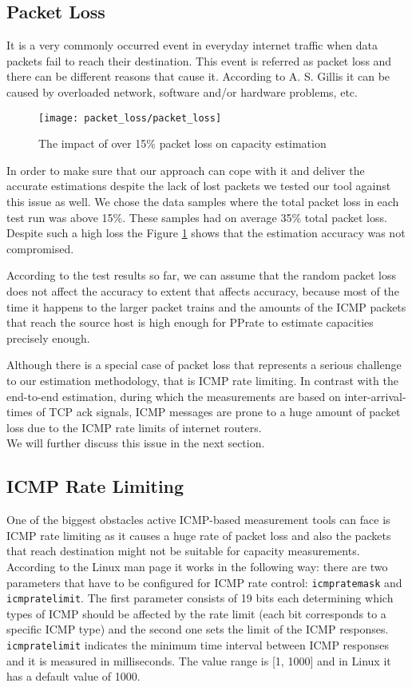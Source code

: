 \subsection{Packet Loss}
It is a very commonly occurred event in everyday internet traffic when data packets fail to reach their destination. This event is referred as packet loss and there can be different reasons that cause it. According to A. S. Gillis\cite{packet_loss_explained} it can be caused by overloaded network, software and/or hardware problems, etc.

\begin{figure}[h]
 \centering
 \texttt{[image: packet\_loss/packet\_loss]}
 \caption{The impact of over 15\% packet loss on capacity estimation}
 \label{packet_loss_graph}
\end{figure}

 In order to make sure that our approach can cope with it and deliver the accurate estimations despite the lack of lost packets we tested our tool against this issue as well.
We chose the data samples where the total packet loss in each test run was above 15\%. These samples had on average 35\% total packet loss. Despite such a high loss the Figure \ref{packet_loss_graph} shows that the estimation accuracy was not compromised. 

According to the test results so far, we can assume that the random packet loss does not affect the accuracy to extent that affects accuracy, because most of the time it happens to the larger packet trains and the amounts of the ICMP packets that reach the source host is high enough for PPrate to estimate capacities precisely enough.
 
Although there is a special case of packet loss that represents a serious challenge to our estimation methodology, that is ICMP rate limiting. In contrast with the end-to-end estimation, during which the measurements are based on inter-arrival-times of TCP ack signals, ICMP messages are prone to a huge amount of packet loss due to the ICMP rate limits of internet routers.\\ 
We will further discuss this issue in the next section.


\subsection{ICMP Rate Limiting}
One of the biggest obstacles active ICMP-based measurement tools can face is ICMP rate limiting as it causes a huge rate of packet loss and also the packets that reach destination might not be suitable for capacity measurements. 
According to the Linux man page\cite{icmp_ratemask} it works in the following way: there are two parameters that have to be configured for ICMP rate control: \texttt{icmp\textunderscore ratemask} and \texttt{icmp\textunderscore ratelimit}. The first parameter consists of 19 bits each determining which types of ICMP should be affected by the rate limit (each bit corresponds to a specific ICMP type) and the second one sets the limit of the ICMP responses.
\texttt{icmp\textunderscore ratelimit} indicates the minimum time interval between ICMP responses and it is measured in milliseconds. The value range is [1, 1000]\cite{juniper} and in Linux it has a default value of 1000.

